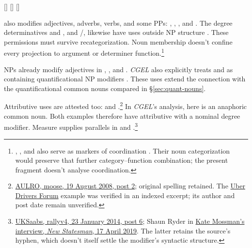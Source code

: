 \documentclass[12pt]{article}
\begin{document}
\ea\label{ex:temporal-adjp}
\ea {} [] 
\ex {} []  [] 
\z\z

 also modifies adjectives, adverbs, verbs, and some PPs: , , , and  \citep[396--397]{huddleston2002}. The degree determinatives  and , and /, likewise have uses outside NP structure \citep[390, 395--397]{huddleston2002}. These permissions must survive recategorization. Noun membership doesn't confine every projection to argument or determiner function.\footnote{, , and  also serve as markers of coordination \citep[1305, 1308]{huddleston2002}. Their noun categorization would preserve that further category--function combination; the present fragment doesn't analyse coordination.}

NPs already modify adjectives in , , and . \textit{CGEL} also explicitly treats  and  as containing quantificational NP modifiers \citep[549--550]{huddleston2002}. These uses extend the connection with the quantificational common nouns compared in §\ref{sec:quant-nouns}.

Attributive uses are attested too:  and .\footnote{\href{https://www.aulro.com/afvb/motor-cycling/61858-my-track-day-phillip-island-motogp-track-post798794.html}{AULRO, moose, 19 August 2008, post 2}; original spelling retained. The \href{https://www.uberpeople.net/threads/let-s-play-would-you-have-taken-this-trip.395130/}{Uber Drivers Forum} example was verified in an indexed excerpt; its author and post date remain unverified.} In \textit{CGEL}'s analysis,  here is an anaphoric common noun. Both examples therefore have attributive  with a nominal degree modifier. Measure  supplies parallels in  and .\footnote{\href{https://www.uksaabs.co.uk/UKS/viewtopic.php?t=131481\#p1256815}{UKSaabs, rallyv4, 23 January 2014, post 6}; Shaun Ryder in \href{https://www.newstatesman.com/culture/2019/04/i-look-like-uncle-fester-the-second-life-of-shaun-ryder}{Kate Mossman's interview, \textit{New Statesman}, 17 April 2019}. The latter retains the source's hyphen, which doesn't itself settle the modifier's syntactic structure.}
\end{document}
